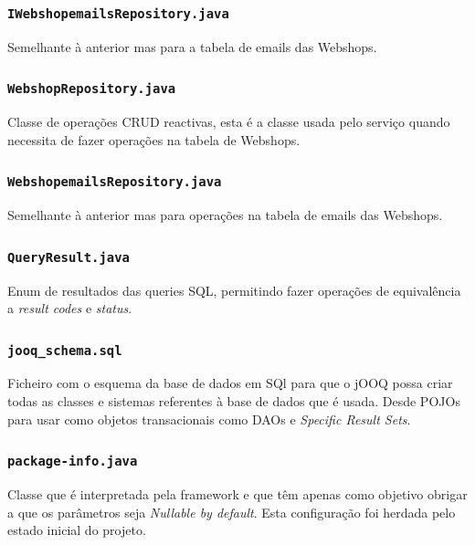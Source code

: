 \subsubsection*{\texttt{IWebshopemailsRepository.java}}

Semelhante à anterior mas para a tabela de emails das Webshops.

\subsubsection*{\texttt{WebshopRepository.java}}

Classe de operações CRUD reactivas, esta é a classe usada pelo serviço quando necessita de fazer operações na tabela de Webshops.

\subsubsection*{\texttt{WebshopemailsRepository.java}}

Semelhante à anterior mas para operações na tabela de emails das Webshops.

\subsubsection*{\texttt{QueryResult.java}}

Enum de resultados das queries SQL, permitindo fazer operações de equivalência a \textit{result codes} e \textit{status}.

\subsubsection*{\texttt{jooq\_schema.sql}}

Ficheiro com o esquema da base de dados em SQl para que o jOOQ possa criar todas as classes e sistemas referentes à base de dados que é usada. Desde POJOs para usar como objetos transacionais como DAOs e \textit{Specific Result Sets}.

\subsubsection*{\texttt{package-info.java}}

Classe que é interpretada pela framework e que têm apenas como objetivo obrigar a que os parâmetros seja \textit{Nullable by default}. Esta configuração foi herdada pelo estado inicial do projeto.

\newpage


